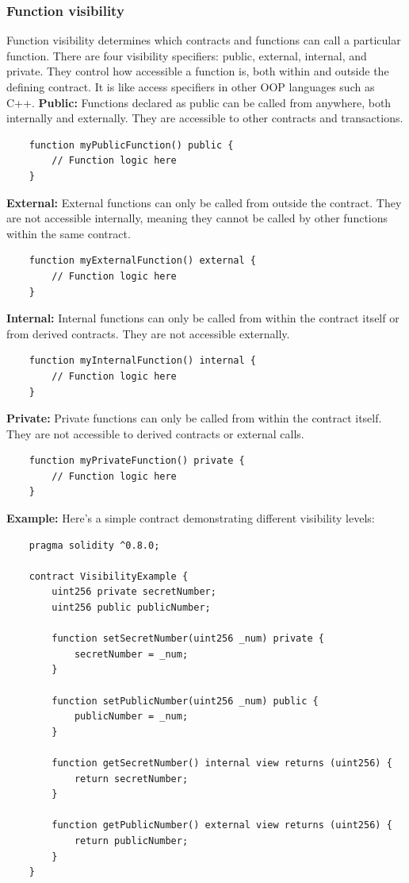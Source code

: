 \documentclass[12pt, a4paper]{article}
\begin{document}
\subsubsection{Function visibility}
Function visibility determines which contracts and functions can call a particular function. There are four visibility specifiers: public, external, internal, and private. They control how accessible a function is, both within and outside the defining contract. It is like access specifiers in other OOP languages such as C++.
\textbf{Public:} Functions declared as public can be called from anywhere, both internally and externally. They are accessible to other contracts and transactions.
\begin{verbatim}
    function myPublicFunction() public {
        // Function logic here
    }
\end{verbatim}
\textbf{External:} External functions can only be called from outside the contract. They are not accessible internally, meaning they cannot be called by other functions within the same contract.
\begin{verbatim}
    function myExternalFunction() external {
        // Function logic here
    }
\end{verbatim}
\textbf{Internal:} Internal functions can only be called from within the contract itself or from derived contracts. They are not accessible externally.
\begin{verbatim}
    function myInternalFunction() internal {
        // Function logic here
    }
\end{verbatim}
\textbf{Private:} Private functions can only be called from within the contract itself. They are not accessible to derived contracts or external calls.
\begin{verbatim}
    function myPrivateFunction() private {
        // Function logic here
    }
\end{verbatim}
\textbf{Example:}
Here’s a simple contract demonstrating different visibility levels:
\begin{verbatim}
    pragma solidity ^0.8.0;

    contract VisibilityExample {
        uint256 private secretNumber;
        uint256 public publicNumber;

        function setSecretNumber(uint256 _num) private {
            secretNumber = _num;
        }

        function setPublicNumber(uint256 _num) public {
            publicNumber = _num;
        }

        function getSecretNumber() internal view returns (uint256) {
            return secretNumber;
        }

        function getPublicNumber() external view returns (uint256) {
            return publicNumber;
        }
    }
\end{verbatim}
\end{document}
